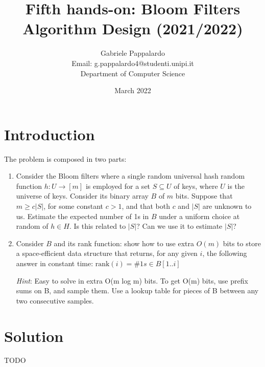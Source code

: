 \documentclass{article}
\title{Fifth hands-on: Bloom Filters \\[1ex] \large Algorithm Design (2021/2022)}
\author{Gabriele Pappalardo\\Email: g.pappalardo4@studenti.unipi.it\\Department of Computer Science}
\date{March 2022}
\begin{document}
\maketitle

\section{Introduction}

The problem is composed in two parts:

\begin{enumerate}
    \item Consider the Bloom filters where a single random universal hash random function $h : U \to [m]$ is employed for a set $S \subseteq U$ of keys, where $U$ is the universe of keys.
    Consider its binary array $B$ of $m$ bits. Suppose that $m \ge c|S|$, for some constant $c > 1$, and that both $c$ and $|S|$ are unknown to us.   
    Estimate the expected number of 1s in $B$ under a uniform choice at random of $h \in H$. Is this related to $|S|$? Can we use it to estimate $|S|$? 
    
    \item Consider $B$ and its rank function: show how to use extra $O(m)$ bits to store a space-efficient data structure that returns, for any given $i$, the following answer in constant time: 
    $\textrm{rank}(i) = \#1s \in B[1..i]$
    
    \textit{Hint}: Easy to solve in extra O(m log m) bits. To get O(m) bits, use prefix sums on B, and sample them. Use a lookup table for pieces of B between any two consecutive samples. 
\end{enumerate}

\section{Solution}
TODO
\end{document}
